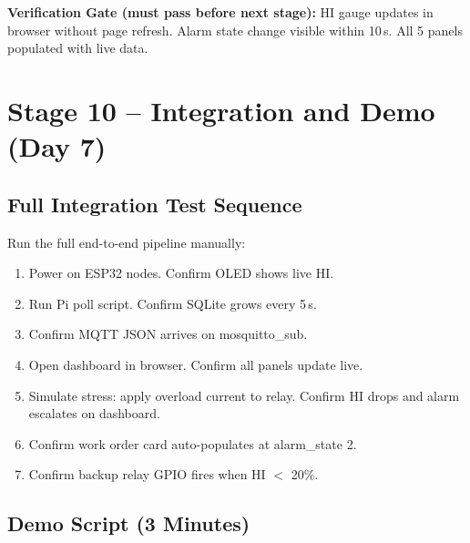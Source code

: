 \documentclass[12pt,a4paper]{article}
\newenvironment{checkgate}{%
  \begin{mdframed}[backgroundcolor=yellow!10,linecolor=orange!70,linewidth=1.5pt,
    innerleftmargin=9pt,innerrightmargin=9pt,innertopmargin=5pt,innerbottommargin=5pt]
  \textbf{\color{orange!70!black}Verification Gate (must pass before next stage): }}{\end{mdframed}}
\begin{document}
\begin{checkgate}
HI gauge updates in browser without page refresh. Alarm state change visible within 10\,s. All 5 panels
populated with live data.
\end{checkgate}

\section{Stage 10 -- Integration and Demo (Day 7)}

\subsection{Full Integration Test Sequence}

Run the full end-to-end pipeline manually:

\begin{enumerate}[noitemsep]
  \item Power on ESP32 nodes. Confirm OLED shows live HI.
  \item Run Pi poll script. Confirm SQLite grows every 5\,s.
  \item Confirm MQTT JSON arrives on mosquitto\_sub.
  \item Open dashboard in browser. Confirm all panels update live.
  \item Simulate stress: apply overload current to relay. Confirm HI drops and alarm escalates on dashboard.
  \item Confirm work order card auto-populates at alarm\_state 2.
  \item Confirm backup relay GPIO fires when HI $<$ 20\%.
\end{enumerate}

\subsection{Demo Script (3 Minutes)}
\end{document}
